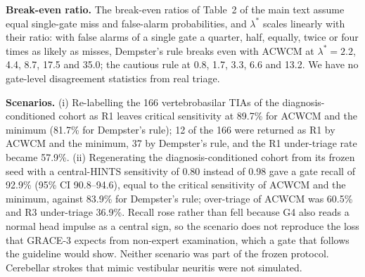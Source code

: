 \documentclass[11pt,a4paper]{article}%
\begin{document}
\textbf{Break-even ratio.} The break-even ratios of Table~2 of the main text assume equal single-gate miss and false-alarm probabilities, and $\lambda^*$ scales linearly with their ratio: with false alarms of a single gate a quarter, half, equally, twice or four times as likely as misses, Dempster's rule breaks even with ACWCM at $\lambda^*=2.2$, 4.4, 8.7, 17.5 and 35.0; the cautious rule at 0.8, 1.7, 3.3, 6.6 and 13.2. We have no gate-level disagreement statistics from real triage.

\textbf{Scenarios.} (i) Re-labelling the 166 vertebrobasilar TIAs of the diagnosis-conditioned cohort as R1 leaves critical sensitivity at 89.7\% for ACWCM and the minimum (81.7\% for Dempster's rule); 12 of the 166 were returned as R1 by ACWCM and the minimum, 37 by Dempster's rule, and the R1 under-triage rate became 57.9\%. (ii) Regenerating the diagnosis-conditioned cohort from its frozen seed with a central-HINTS sensitivity of 0.80 instead of 0.98 gave a gate recall of 92.9\% (95\% CI 90.8--94.6), equal to the critical sensitivity of ACWCM and the minimum, against 83.9\% for Dempster's rule; over-triage of ACWCM was 60.5\% and R3 under-triage 36.9\%. Recall rose rather than fell because G4 also reads a normal head impulse as a central sign, so the scenario does not reproduce the loss that GRACE-3 expects from non-expert examination, which a gate that follows the guideline would show. Neither scenario was part of the frozen protocol. Cerebellar strokes that mimic vestibular neuritis were not simulated.



\end{document}
